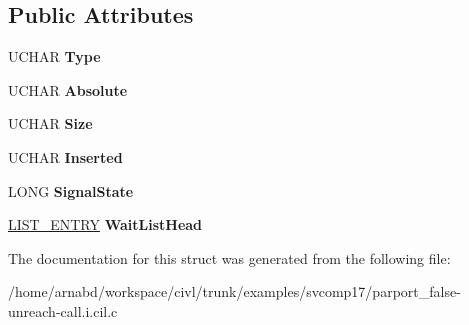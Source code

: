 \subsection*{Public Attributes}
\begin{DoxyCompactItemize}
\item 
\hypertarget{struct__DISPATCHER__HEADER_adf175503efed9e5a94f97c59f688bbf9}{}U\+C\+H\+A\+R {\bfseries Type}\label{struct__DISPATCHER__HEADER_adf175503efed9e5a94f97c59f688bbf9}

\item 
\hypertarget{struct__DISPATCHER__HEADER_aba61b0fa4fddbea4777c63d54efea2c2}{}U\+C\+H\+A\+R {\bfseries Absolute}\label{struct__DISPATCHER__HEADER_aba61b0fa4fddbea4777c63d54efea2c2}

\item 
\hypertarget{struct__DISPATCHER__HEADER_a1bbb6bbcac251f88f2e2065a203a8b71}{}U\+C\+H\+A\+R {\bfseries Size}\label{struct__DISPATCHER__HEADER_a1bbb6bbcac251f88f2e2065a203a8b71}

\item 
\hypertarget{struct__DISPATCHER__HEADER_af8a8f0c55d8e4ce8fc3815c795ab5280}{}U\+C\+H\+A\+R {\bfseries Inserted}\label{struct__DISPATCHER__HEADER_af8a8f0c55d8e4ce8fc3815c795ab5280}

\item 
\hypertarget{struct__DISPATCHER__HEADER_ae08f84f6c1aef190a52bc8436649ac3f}{}L\+O\+N\+G {\bfseries Signal\+State}\label{struct__DISPATCHER__HEADER_ae08f84f6c1aef190a52bc8436649ac3f}

\item 
\hypertarget{struct__DISPATCHER__HEADER_a9dd7a963d7db0ab3293d3e75c52d6bbc}{}\hyperlink{struct__LIST__ENTRY}{L\+I\+S\+T\+\_\+\+E\+N\+T\+R\+Y} {\bfseries Wait\+List\+Head}\label{struct__DISPATCHER__HEADER_a9dd7a963d7db0ab3293d3e75c52d6bbc}

\end{DoxyCompactItemize}


The documentation for this struct was generated from the following file\+:\begin{DoxyCompactItemize}
\item 
/home/arnabd/workspace/civl/trunk/examples/svcomp17/parport\+\_\+false-\/unreach-\/call.\+i.\+cil.\+c\end{DoxyCompactItemize}
